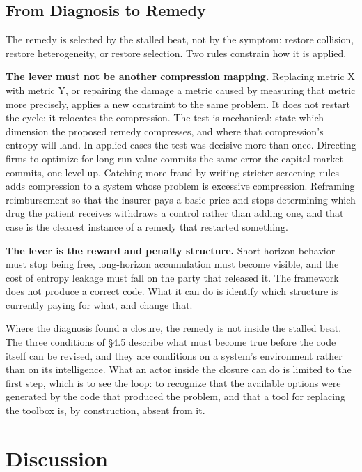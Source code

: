 \documentclass[11pt,a4paper]{article}
\begin{document}
\subsection{From Diagnosis to Remedy}

The remedy is selected by the stalled beat, not by the symptom: restore collision, restore heterogeneity, or restore selection. Two rules constrain how it is applied.

\textbf{The lever must not be another compression mapping.} Replacing metric X with metric Y, or repairing the damage a metric caused by measuring that metric more precisely, applies a new constraint to the same problem. It does not restart the cycle; it relocates the compression. The test is mechanical: state which dimension the proposed remedy compresses, and where that compression's entropy will land. In applied cases the test was decisive more than once. Directing firms to optimize for long-run value commits the same error the capital market commits, one level up. Catching more fraud by writing stricter screening rules adds compression to a system whose problem is excessive compression. Reframing reimbursement so that the insurer pays a basic price and stops determining which drug the patient receives withdraws a control rather than adding one, and that case is the clearest instance of a remedy that restarted something.

\textbf{The lever is the reward and penalty structure.} Short-horizon behavior must stop being free, long-horizon accumulation must become visible, and the cost of entropy leakage must fall on the party that released it. The framework does not produce a correct code. What it can do is identify which structure is currently paying for what, and change that.

Where the diagnosis found a closure, the remedy is not inside the stalled beat. The three conditions of \S4.5 describe what must become true before the code itself can be revised, and they are conditions on a system's environment rather than on its intelligence. What an actor inside the closure can do is limited to the first step, which is to see the loop: to recognize that the available options were generated by the code that produced the problem, and that a tool for replacing the toolbox is, by construction, absent from it.

\section{Discussion}
\end{document}
